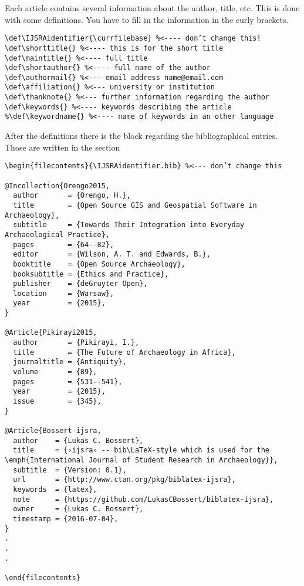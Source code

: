 \documentclass[
	]{ijsra}
\makeatletter
\def\IJSRAidentifier{\currfilebase}
\def\shorttitle{The \texttt{ijsra}-class, Version \IJSRAversion\ -- \IJSRAversiondate}
\def\maintitle{The \texttt{ijsra}-class, Version \IJSRAversion\ -- \IJSRAversiondate}
\def\shortauthor{Lukas C. Bossert}
\def\authormail{lukas@digitales-altertum.de}
\def\affiliation{Humboldt-Universität zu Berlin | Excellence-Cluster Topoi}
\def\thanknote{The coding of this documentclass is done at \href{https://github.com/LukasCBossert/documentclass-ijsra}{https://github.com/LukasCBossert/documentclass-ijsra} }
\def\keywords{documentclass, \LaTeX , IJSRA}
\makeatother
\begin{document}
\IJSRAseparator
Each article contains several information about the author, title, etc. 
This is done with some definitions. 
You have to fill in the information in the curly brackets.
\begin{lstlisting}[label=information,caption={Information about the article}]
\def\IJSRAidentifier{\currfilebase} %<---- don’t change this!
\def\shorttitle{} %<---- this is for the short title
\def\maintitle{} %<---- full title
\def\shortauthor{} %<---- full name of the author
\def\authormail{} %<--- email address name@email.com
\def\affiliation{} %<--- university or institution
\def\thanknote{} %<--- further information regarding the author
\def\keywords{} %<---- keywords describing the article
%\def\keywordname{} %<---- name of keywords in an other language
\end{lstlisting}
\IJSRAseparator
After the definitions there is the block regarding the bibliographical entries.
Those are written in the section 
\begin{lstlisting}[label=bibliography,caption={Bibliographical information}]
\begin{filecontents}{\IJSRAidentifier.bib} %<--- don’t change this

@Incollection{Orengo2015,
  author       = {Orengo, H.},
  title        = {Open Source GIS and Geospatial Software in Archaeology},
  subtitle     = {Towards Their Integration into Everyday Archaeological Practice},
  pages        = {64--82},
  editor       = {Wilson, A. T. and Edwards, B.},
  booktitle    = {Open Source Archaeology},
  booksubtitle = {Ethics and Practice},
  publisher    = {deGruyter Open},
  location     = {Warsaw},
  year         = {2015},
}

@Article{Pikirayi2015,
  author       = {Pikirayi, I.},
  title        = {The Future of Archaeology in Africa},
  journaltitle = {Antiquity},
  volume       = {89},
  pages        = {531--541},
  year         = {2015},
  issue        = {345},
}

@Article{Bossert-ijsra,
  author    = {Lukas C. Bossert},
  title     = {›ijsra‹ -- bib\LaTeX-style which is used for the \emph{International Journal of Student Research in Archaeology}},
  subtitle  = {Version: 0.1},
  url       = {http://www.ctan.org/pkg/biblatex-ijsra},
  keywords  = {latex},
  note      = {https://github.com/LukasCBossert/biblatex-ijsra},
  owner     = {Lukas C. Bossert},
  timestamp = {2016-07-04},
}
.
.
.

\end{filecontents}
\end{lstlisting}
\end{document}
